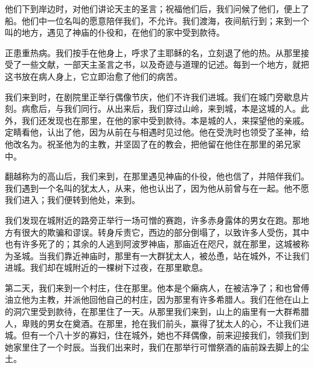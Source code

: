 他们下到岸边时，对他们讲论天主的圣言；祝福他们后，我们问候了他们，便上了船。他们中一位名叫的愿意陪伴我们，不允许。我们渡海，夜间航行到；来到一个叫的地方，遇见了神庙的仆役和，在他们的家中受到款待。\par

正患重热病。我们按手在他身上，呼求了主耶稣的名，立刻退了他的热。从那里接受了一些文献，一部天主圣言之书，以及奇迹与道理的记述。每到一个地方，就把这书放在病人身上，它立即治愈了他们的病苦。\par

我们来到时，在剧院里正举行偶像节庆，他们不许我们进城。我们在城门旁歇息片刻。病愈后，与我们同行。从出来后，我们穿过山岭，来到城，本是这城的人。此外，我们还发现也在那里，在他的家中受到款待。本是城的人，来探望他的亲戚。定睛看他，认出了他，因为从前在与相遇时见过他。他在受洗时也领受了圣神，给他改名为。祝圣他为的主教，并坚固了在的教会，把他留在他住在那里的弟兄家中。\par

翻越称为的高山后，我们来到，在那里遇见神庙的仆役，他也信了，并陪伴我们。我们遇到一个名叫的犹太人，从来，他也认出了，因为他从前曾与在一起。他不愿我们进入；我们便转到他处，来到。\par

我们发现在城附近的路旁正举行一场可憎的赛跑，许多赤身露体的男女在跑。那地方有很大的欺骗和谬误。转身斥责它，西边的部分倒塌了，以致许多人受伤，其中也有许多死了的；其余的人逃到阿波罗神庙，那庙近在咫尺，就在那里，这城被称为圣城。当我们靠近神庙时，那里有一大群犹太人，被怂恿，站在城外，不让我们进城。我们却在城附近的一棵树下过夜，在那里歇息。\par

第二天，我们来到一个村庄，住在那里。他本是个癞病人，在被洁净了；和也曾傅油立他为主教，并派他回他自己的村庄，因为那里有许多希腊人。我们在他在山上的洞穴里受到款待，在那里住了一天。从那里我们来到，山上的庙里有一大群希腊人，卑贱的男女在奠酒。在那里，抢在我们前头，赢得了犹太人的心，不让我们进城。但有一个八十岁的寡妇，住在城外，她也不拜偶像，前来迎接我们，领我们到她家里住了一个时辰。当我们出来时，我们在那举行可憎祭酒的庙前跺去脚上的尘土。\par

